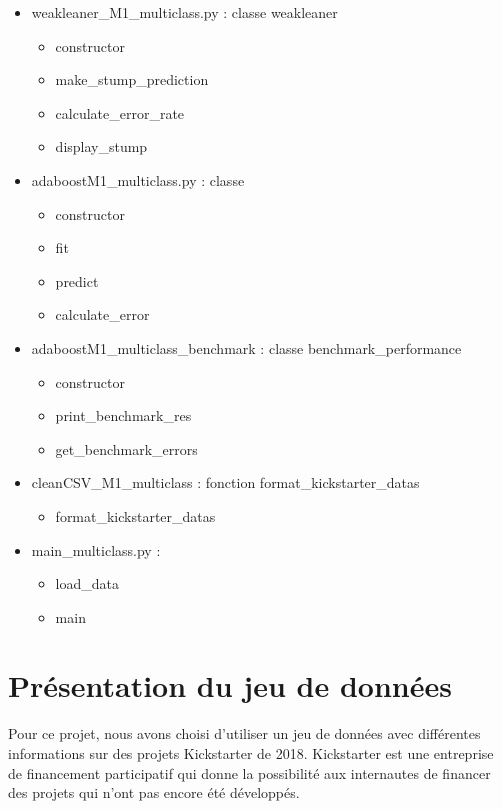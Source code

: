 \documentclass{article}
\begin{document}
\begin{itemize}
  \item weakleaner\_M1\_multiclass.py : classe weakleaner
  \begin{itemize}
    \item constructor
    \item make\_stump\_prediction
    \item calculate\_error\_rate
    \item display\_stump
  \end{itemize}
  \item adaboostM1\_multiclass.py : classe 
  \begin{itemize}
    \item constructor
    \item fit
    \item predict
    \item calculate\_error
  \end{itemize}
  \item adaboostM1\_multiclass\_benchmark : classe benchmark\_performance
  \begin{itemize}
        \item constructor
        \item print\_benchmark\_res
        \item get\_benchmark\_errors
    \end{itemize}
  \item cleanCSV\_M1\_multiclass : fonction format\_kickstarter\_datas
  \begin{itemize}
        \item format\_kickstarter\_datas
    \end{itemize}
  \item main\_multiclass.py :
  \begin{itemize}
          \item load\_data
          \item main
    \end{itemize}
\end{itemize}


\section{Présentation du jeu de données}

Pour ce projet, nous avons choisi d'utiliser un jeu de données avec différentes informations sur des projets Kickstarter de 2018. Kickstarter est une entreprise de financement participatif qui donne la possibilité aux internautes de financer des projets qui n'ont pas encore été développés.\newline 
\end{document}
